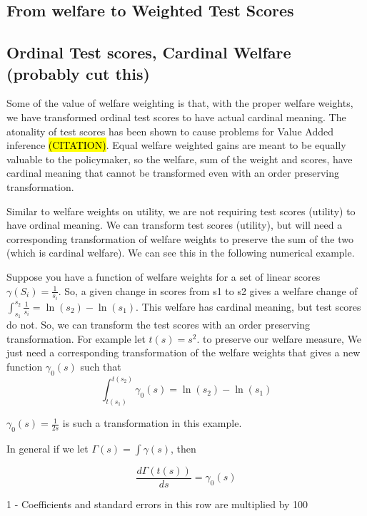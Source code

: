 \documentclass[12pt]{article}
\theoremstyle{definition}
\theoremstyle{definition}
\theoremstyle{definition}
\theoremstyle{definition}
\begin{document}
\subsection{From welfare to Weighted Test Scores}



   \subsection{Ordinal Test scores, Cardinal Welfare (probably cut this)}
   \label{Cardinal_note}
    Some of the value of welfare weighting is that, with the proper welfare weights, we have transformed ordinal test scores to have actual cardinal meaning. The atonality of test scores has been shown to cause problems for Value Added inference \hl{(CITATION)}. Equal welfare weighted gains are meant to be equally valuable to the policymaker, so the welfare, sum of the weight and scores, have cardinal meaning that cannot be transformed even with an order preserving transformation. 
    
    Similar to welfare weights on utility, we are not requiring test scores (utility) to have ordinal meaning. We can transform test scores (utility), but will need a corresponding transformation of welfare weights to preserve the sum of the two (which is cardinal welfare). We can see this in the following numerical example. 
    
    Suppose you have a function of welfare weights for a set of linear scores $\gamma(S_i) = \frac{1}{s_i}$. So, a given change in scores from s1 to s2 gives a welfare change of $\int_{s_1}^{s_2} \frac{1}{s_i} = \ln(s_2)-\ln(s_1)$. This welfare has cardinal meaning, but test scores do not. So, we can transform the test scores with an order preserving transformation. For example let $t(s) = s^2$. to preserve our welfare measure, We just need a corresponding transformation of the welfare weights that gives a new function $\gamma_0(s)$ such that 
    $$\int_{t(s_1)}^{t(s_2)}\gamma_0(s)  = \ln(s_2)-\ln(s_1)$$
    
    $\gamma_0(s) = \frac{1}{2s}$ is such a transformation in this example. 
    
    In general if we let $\Gamma(s) = \int \gamma(s)$, then 
    
    $$ \frac{d \Gamma(t(s)) }{ ds} = \gamma_0(s) $$
    

\begin{table}[ht]
    \centering
    
    \label{tab:teacher_char}
    \bigskip
    
    \footnotesize{1 - Coefficients and standard errors in this row are multiplied by 100}
\end{table}
\end{document}
